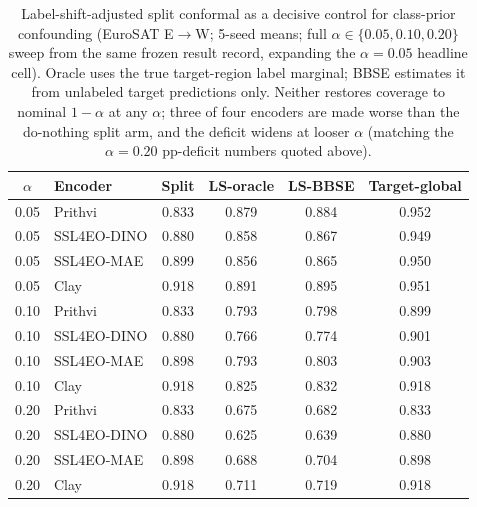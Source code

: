 \documentclass[journal]{IEEEtran}
\renewcommand{\_}{\textunderscore\allowbreak}
\begin{document}
\begin{table}[t]\centering\small
\caption{Label-shift-adjusted split conformal \citep{podkopaev2021labelshift} as a decisive control for
class-prior confounding (EuroSAT E$\to$W; 5-seed means; full $\alpha\in\{0.05,0.10,0.20\}$ sweep from the
same frozen result record, expanding the $\alpha{=}0.05$ headline cell). Oracle uses the true target-region
label marginal; BBSE \citep{lipton2018bbse} estimates it from unlabeled target predictions only. Neither
restores coverage to nominal $1{-}\alpha$ at any $\alpha$; three of four encoders are made worse than the
do-nothing split arm, and the deficit widens at looser $\alpha$ (matching the $\alpha=0.20$ pp-deficit
numbers quoted above).}\label{tab:labelshift}
\begin{tabular}{clcccc}
\toprule
$\alpha$ & Encoder & Split & LS-oracle & LS-BBSE & Target-global \\
\midrule
0.05 & Prithvi     & 0.833 & 0.879 & 0.884 & 0.952 \\
0.05 & SSL4EO-DINO & 0.880 & 0.858 & 0.867 & 0.949 \\
0.05 & SSL4EO-MAE  & 0.899 & 0.856 & 0.865 & 0.950 \\
0.05 & Clay        & 0.918 & 0.891 & 0.895 & 0.951 \\
\midrule
0.10 & Prithvi     & 0.833 & 0.793 & 0.798 & 0.899 \\
0.10 & SSL4EO-DINO & 0.880 & 0.766 & 0.774 & 0.901 \\
0.10 & SSL4EO-MAE  & 0.898 & 0.793 & 0.803 & 0.903 \\
0.10 & Clay        & 0.918 & 0.825 & 0.832 & 0.918 \\
\midrule
0.20 & Prithvi     & 0.833 & 0.675 & 0.682 & 0.833 \\
0.20 & SSL4EO-DINO & 0.880 & 0.625 & 0.639 & 0.880 \\
0.20 & SSL4EO-MAE  & 0.898 & 0.688 & 0.704 & 0.898 \\
0.20 & Clay        & 0.918 & 0.711 & 0.719 & 0.918 \\
\bottomrule
\end{tabular}
\end{table}
\end{document}
